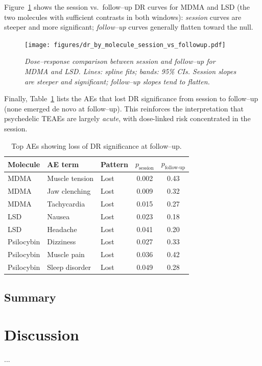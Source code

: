 \documentclass[12pt,a4paper]{article}
\begin{document}
Figure~\ref{fig:dr_session_followup} shows the session vs.\ follow--up DR curves for MDMA and LSD (the two molecules with sufficient contrasts in both windows): \emph{session} curves are steeper and more significant; \emph{follow--up} curves generally flatten toward the null.

\begin{figure}[ht!]
\centering
\texttt{[image: figures/dr\_by\_molecule\_session\_vs\_followup.pdf]}
\caption{\textit{Dose--response comparison between \emph{session} and \emph{follow--up} for MDMA and LSD. Lines: spline fits; bands: 95\% CIs. Session slopes are steeper and significant; follow--up slopes tend to flatten.}}
\label{fig:dr_session_followup}
\end{figure}

Finally, Table~\ref{tab:lost_ae} lists the AEs that lost DR significance from session to follow--up (none emerged de novo at follow--up). This reinforces the interpretation that psychedelic TEAEs are largely \emph{acute}, with dose-linked risk concentrated in the session.

\begin{table}[ht!]
\centering
\caption{Top AEs showing loss of DR significance at follow--up.}
\label{tab:lost_ae}
\begin{tabular}{lllcc}
\toprule
Molecule & AE term & Pattern & $p_{\text{session}}$ & $p_{\text{follow-up}}$ \\
\midrule
MDMA & Muscle tension & Lost & 0.002 & 0.43 \\
MDMA & Jaw clenching  & Lost & 0.009 & 0.32 \\
MDMA & Tachycardia    & Lost & 0.015 & 0.27 \\
LSD  & Nausea         & Lost & 0.023 & 0.18 \\
LSD  & Headache       & Lost & 0.041 & 0.20 \\
Psilocybin & Dizziness    & Lost & 0.027 & 0.33 \\
Psilocybin & Muscle pain  & Lost & 0.036 & 0.42 \\
Psilocybin & Sleep disorder & Lost & 0.049 & 0.28 \\
\bottomrule
\end{tabular}
\end{table}


\subsection{Summary}


\section{Discussion}
...



\end{document}
